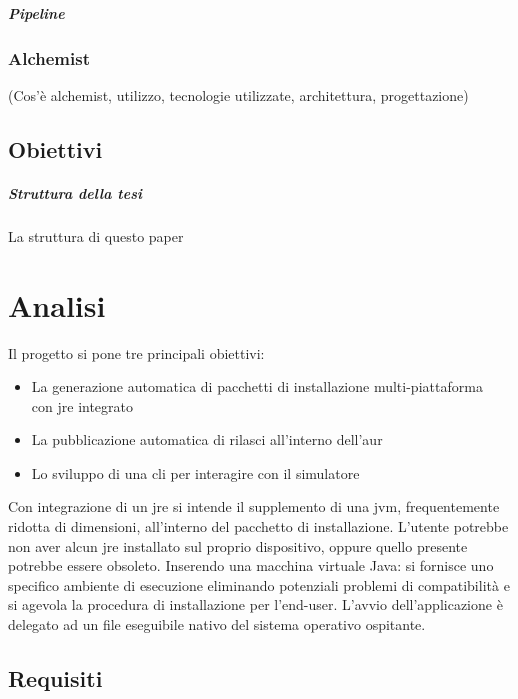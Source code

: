 \documentclass[12pt,a4paper,openright,twoside]{book}
\begin{document}
\paragraph{Pipeline}

\subsection{Alchemist}

(Cos'è alchemist, utilizzo, tecnologie utilizzate, architettura, progettazione)

\section{Obiettivi}

\paragraph{Struttura della tesi}

La struttura di questo paper

\chapter{Analisi}

Il progetto si pone tre principali obiettivi:
\begin{itemize}
	\setlength\itemsep{0.8em}
	\item La generazione automatica di pacchetti di installazione multi-piattaforma \\ con \ac{jre} integrato
	\item La pubblicazione automatica di rilasci all'interno dell'\ac{aur}
	\item Lo sviluppo di una \ac{cli} per interagire con il simulatore
\end{itemize}

Con integrazione di un \ac{jre} si intende il supplemento di una \ac{jvm}, frequentemente ridotta di dimensioni, all'interno del pacchetto di installazione.
L'utente potrebbe non aver alcun \ac{jre} installato sul proprio dispositivo, oppure quello presente potrebbe essere obsoleto. Inserendo una macchina virtuale Java: si fornisce uno specifico ambiente di esecuzione eliminando potenziali problemi di compatibilità e si agevola la procedura di installazione per l'end-user. L'avvio dell'applicazione è delegato ad un file eseguibile nativo del sistema operativo ospitante.

\section{Requisiti}
\end{document}
